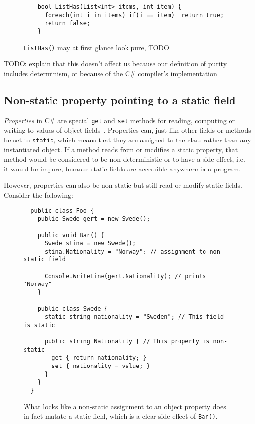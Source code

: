 \documentclass[a4paper,12pt]{article}
\begin{document}
\begin{figure}[H]
  \centering
  \begin{lstlisting}
    bool ListHas(List<int> items, int item) {
      foreach(int i in items) if(i == item)  return true;
      return false;
    }
  \end{lstlisting}
  \caption{\texttt{ListHas()} may at first glance look pure, TODO}
  \label{fig:iterator-example}
\end{figure}

TODO: explain that this doesn't affect us because our definition of purity includes determinism, or because of the C\# compiler's implementation

\subsection{Non-static property pointing to a static field} \label{sub:non-static-property}
\textit{Properties} in C\# are special \texttt{get} and \texttt{set} methods for reading, computing or writing to values of object fields~\cite{microsoft-properties}. Properties can, just like other fields or methods be set to \texttt{static}, which means that they are assigned to the class rather than any instantiated object. If a method reads from or modifies a static property, that method would be considered to be non-deterministic or to have a side-effect, i.e. it would be impure, because static fields are accessible anywhere in a program.

However, properties can also be non-static but still read or modify static fields. Consider the following:

\begin{figure}[H]
  \centering
  \begin{lstlisting}
  public class Foo {
    public Swede gert = new Swede();

    public void Bar() {
      Swede stina = new Swede();
      stina.Nationality = "Norway"; // assignment to non-static field

      Console.WriteLine(gert.Nationality); // prints "Norway"
    }

    public class Swede {
      static string nationality = "Sweden"; // This field is static

      public string Nationality { // This property is non-static
        get { return nationality; }
        set { nationality = value; }
      }
    }
  }
  \end{lstlisting}
  \caption{What looks like a non-static assignment to an object property does in fact mutate a static field, which is a clear side-effect of \texttt{Bar()}.}
  \label{fig:non-static-property-example}
\end{figure}
\end{document}
